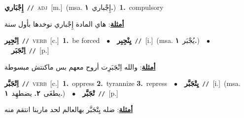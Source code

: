 \documentclass[10pt,a4paper,twoside]{article} %
\begin{document}
\begin{multicols}{2}
{{\setlength\topsep{0pt}\textbf{\foreignlanguage{arabic}{إِجْبَاري}}\ {\color{gray}\texttt{//}\color{black}}\ \textsc{adj}\ [m.]\ \color{gray}(msa. \foreignlanguage{arabic}{إِجْباري}~\foreignlanguage{arabic}{\textbf{١.}})\color{black}\ \textbf{1.}~compulsory\  \begin{flushright}\color{gray}\foreignlanguage{arabic}{\textbf{\underline{\foreignlanguage{arabic}{أمثلة}}}: هاي المادة إِجْباري نوخدها بأول سنة}\end{flushright}\color{black}} \vspace{2mm}

{\setlength\topsep{0pt}\textbf{\foreignlanguage{arabic}{اِنْجِبِر}}\ {\color{gray}\texttt{//}\color{black}}\ \textsc{verb}\ [c.]\ \textbf{1.}~be forced\ \ $\bullet$\ \ \setlength\topsep{0pt}\textbf{\foreignlanguage{arabic}{يِنْجِبِر}}\ {\color{gray}\texttt{//}\color{black}}\ [i.]\ \color{gray}(msa. \foreignlanguage{arabic}{يُجْبَر}~\foreignlanguage{arabic}{\textbf{١.}})\color{black}\ \ $\bullet$\ \ \setlength\topsep{0pt}\textbf{\foreignlanguage{arabic}{اِنْجَبَر}}\ {\color{gray}\texttt{//}\color{black}}\ [p.]\  \begin{flushright}\color{gray}\foreignlanguage{arabic}{\textbf{\underline{\foreignlanguage{arabic}{أمثلة}}}: والله اِنْجَبَرِت أروح معهم بس ماكنتش مبسوطة}\end{flushright}\color{black}} \vspace{2mm}

{\setlength\topsep{0pt}\textbf{\foreignlanguage{arabic}{اِتْجَبَّر}}\ {\color{gray}\texttt{//}\color{black}}\ \textsc{verb}\ [c.]\ \textbf{1.}~oppress  \textbf{2.}~tyrannize  \textbf{3.}~repress\ \ $\bullet$\ \ \setlength\topsep{0pt}\textbf{\foreignlanguage{arabic}{يِتْجَبَّر}}\ {\color{gray}\texttt{//}\color{black}}\ [i.]\ \color{gray}(msa. \foreignlanguage{arabic}{يطغَى}~\foreignlanguage{arabic}{\textbf{٢.}}  \foreignlanguage{arabic}{يضطهِد}~\foreignlanguage{arabic}{\textbf{١.}})\color{black}\ \ $\bullet$\ \ \setlength\topsep{0pt}\textbf{\foreignlanguage{arabic}{تْجَبَّر}}\ {\color{gray}\texttt{//}\color{black}}\ [p.]\  \begin{flushright}\color{gray}\foreignlanguage{arabic}{\textbf{\underline{\foreignlanguage{arabic}{أمثلة}}}: ضله يِتْجَبَّر بهالعالم لحد ماربنا انتقم منه}\end{flushright}\color{black}} \vspace{2mm}

}
\end{multicols}
\end{document}
